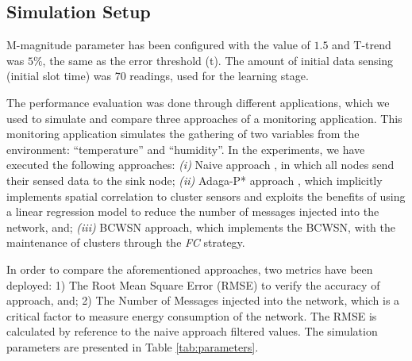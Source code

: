 \documentclass{acm_proc_article-sp}
\begin{document}
\subsection{Simulation Setup}
\label{data-and-experiments}

M-magnitude parameter has been configured with the value of $1.5$ and T-trend
was $5\%$, the same as the error threshold (t). The amount of initial data sensing
(initial slot time) was 70 readings, used for the learning stage.
\vspace*{-.3cm}

The performance evaluation was done through different applications, which we used
to simulate and compare three approaches of a monitoring application. 
This monitoring application simulates the gathering of two variables from the
environment: ``temperature'' and ``humidity''.
In the experiments, we have executed the following approaches: {\it
  (i)} Naive approach \cite{Madden2005}, in which all nodes send their sensed
data to the sink node;  {\it
  (ii)} Adaga-P* approach \cite{MaiaSAC2013, MaiaACR2013}, which
implicitly implements spatial correlation to cluster sensors and exploits the
benefits of using a linear regression model to reduce the number of messages
injected into the network, and;  {\it 
  (iii)} BCWSN approach, which implements the BCWSN, with the maintenance of 
clusters through the \textit{FC} strategy.
\vspace*{-.3cm}

In order to compare the aforementioned approaches, two metrics have been
deployed: 1) The Root Mean Square Error (RMSE) to verify the accuracy of
approach, and; 2) The Number of Messages injected into the network, which is a
critical factor to measure energy consumption of the network. The RMSE is
calculated by reference to the naive approach filtered values.
The simulation parameters are presented in Table \ref{tab:parameters}.
\end{document}
